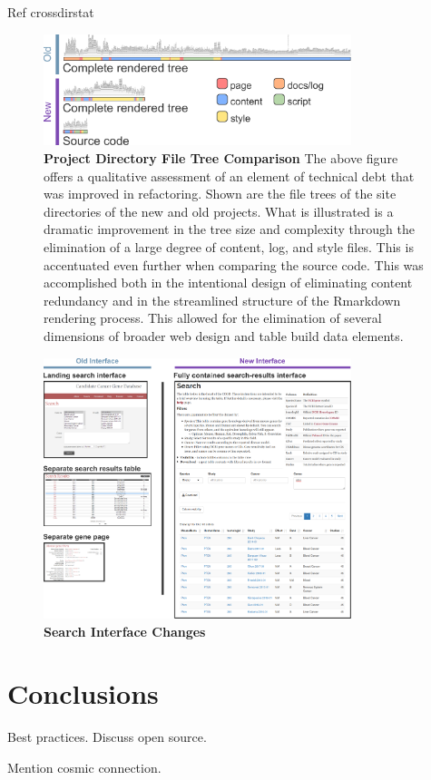 \documentclass[10pt]{report}
\begin{document}
Ref crossdirstat

\begin{figure}[H]
    \center{}
    \includegraphics[width=0.8\textwidth]{fig/file_tree.pdf}
    \caption[Project Directory File Tree Comparison]{\textbf{Project Directory File Tree Comparison} The above figure offers a qualitative assessment of an element of technical debt that was improved in refactoring. Shown are the file trees of the site directories of the new and old projects. What is illustrated is a dramatic improvement in the tree size and complexity through the elimination of a large degree of content, log, and style files. This is accentuated even further when comparing the source code. This was accomplished both in the intentional design of eliminating content redundancy and in the streamlined structure of the Rmarkdown rendering process. This allowed for the elimination of several dimensions of broader web design and table build data elements.}\label{fig:fileTree}
\end{figure}


\begin{figure}[H]
    \center{}
    \includegraphics[width=0.8\textwidth]{fig/interface.pdf}
    \caption[Search Interface Changes]{\textbf{Search Interface Changes}}\label{fig:interface}
\end{figure}



\chapter{Conclusions}

Best practices. Discuss open source.

Mention cosmic connection.

\printbibliography{}
\end{document}

